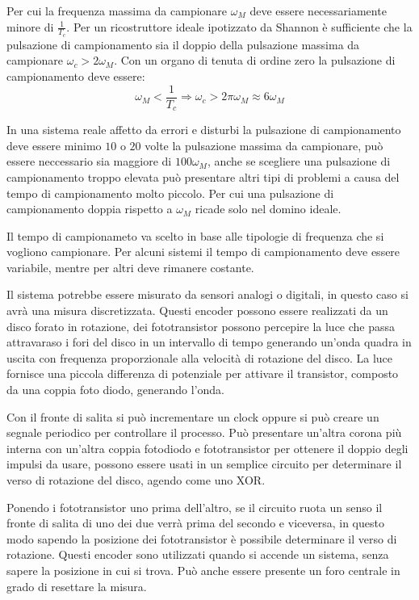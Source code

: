 \documentclass{article}
\numberwithin{equation}{subsection}
\begin{document}
Per cui la frequenza massima da campionare $\omega_M$ deve essere necessariamente minore di $\displaystyle\frac{1}{T_c}$. Per un ricostruttore ideale ipotizzato da Shannon 
è sufficiente che la pulsazione di campionamento sia il doppio della pulsazione massima da campionare $\omega_c>2\omega_M$. Con un organo di tenuta di ordine zero la 
pulsazione di campionamento deve essere: 
\begin{equation}
    \displaystyle \omega_M<\frac{1}{T_c}\Rightarrow \omega_c>2\pi\omega_M\approx6\omega_M
\end{equation}

In una sistema reale affetto da errori e disturbi la pulsazione di campionamento deve essere 
minimo $10$ o $20$ volte la pulsazione massima da campionare, può essere neccessario sia maggiore di $100\omega_M$, anche se scegliere una pulsazione di 
campionamento troppo elevata può presentare altri tipi di problemi a causa del tempo di campionamento molto piccolo. 
Per cui una pulsazione di campionamento doppia rispetto a $\omega_M$ ricade solo nel domino ideale. 



Il tempo di campionameto va scelto in base alle tipologie di frequenza che si vogliono campionare. Per alcuni sistemi il tempo di campionamento deve essere variabile, 
mentre per altri deve rimanere costante. 




Il sistema potrebbe essere misurato da sensori analogi o digitali, in questo caso si avrà una misura discretizzata. Questi encoder possono essere realizzati da un disco 
forato in rotazione, dei fototransistor possono percepire la luce che passa attravaraso i fori del disco in un intervallo di tempo generando un'onda quadra in uscita con 
frequenza proporzionale alla velocità di rotazione del disco. La luce fornisce una piccola differenza di potenziale per attivare il transistor, composto da una coppia 
foto diodo, generando l'onda. 


Con il fronte di salita si può incrementare un clock oppure si può creare un segnale periodico per controllare il processo. 
Può presentare un'altra corona più interna con un'altra coppia fotodiodo e fototransistor per ottenere il doppio degli impulsi da usare, possono essere usati in un semplice 
circuito per determinare il verso di rotazione del disco, agendo come uno XOR. 



Ponendo i fototransistor uno prima dell'altro, se il circuito ruota un senso il fronte di salita di uno dei due verrà prima del secondo e viceversa, in questo modo 
sapendo la posizione dei fototransistor è possibile determinare il verso di rotazione. 
Questi encoder sono utilizzati quando si accende un sistema, senza sapere la posizione in cui si trova. Può anche essere presente un foro centrale in grado di 
resettare la misura. 
\end{document}
